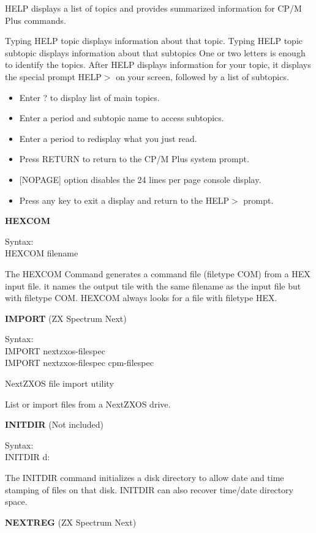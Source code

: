 HELP displays a list of topics and provides summarized information for
CP/M Plus commands.

Typing HELP topic displays information about that topic. Typing HELP
topic subtopic displays information about that subtopics One or two
letters is enough to identify the topics. After HELP displays
information for your topic, it displays the special prompt HELP\(>\)
on your screen, followed by a list of subtopics.

\begin{itemize}
\item Enter ? to display list of main topics.
\item Enter a period and subtopic name to access subtopics.
\item Enter a period to redisplay what you just read.
\item Press RETURN to return to the CP/M Plus system prompt.
\item {[NOPAGE]} option disables the 24 lines per page console display.
\item Press any key to exit a display and return to the HELP\(>\) prompt.
\end{itemize}

\textbf{HEXCOM}

\hangindent=0.7cm Syntax:\\
HEXCOM filename

The HEXCOM Command generates a command file (filetype COM) from a HEX
input file. it names the output tile with the same filename as the
input file but with filetype COM. HEXCOM always looks for a file with
filetype HEX.

\textbf{IMPORT} (ZX Spectrum Next)

\hangindent=0.7cm Syntax:\\
IMPORT nextzxos-filespec\\
IMPORT nextzxos-filespec cpm-filespec

NextZXOS file import utility

List or import files from a NextZXOS drive.

\textbf{INITDIR} (Not included)

\hangindent=0.7cm Syntax:\\
INITDIR d:

The INITDIR command initializes a disk directory to allow date and
time stamping of files on that disk. INITDIR can also recover
time/date directory space.

\textbf{NEXTREG} (ZX Spectrum Next)

